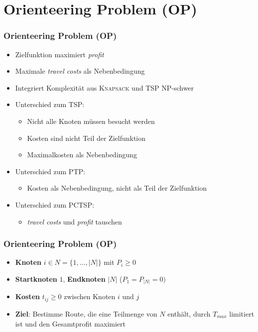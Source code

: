 \documentclass{beamer}
\begin{document}
\section{Orienteering Problem (\textsc{OP})}

\begin{frame}
\frametitle{Orienteering Problem (\textsc{OP})}
\begin{itemize}
  \item Zielfunktion maximiert \textit{profit}
  \item Maximale \textit{travel costs} als Nebenbedingung
  \item Integriert Komplexität aus \textsc{Knapsack} und \textsc{TSP} \textrightarrow NP-schwer
  \item Unterschied zum \textsc{TSP}:
  \begin{itemize}
    \item Nicht alle Knoten müssen besucht werden
    \item Kosten sind nicht Teil der Zielfunktion
    \item Maximalkosten als Nebenbedingung
  \end{itemize}
  \item Unterschied zum \textsc{PTP}: 
  \begin{itemize}
    \item Kosten als Nebenbedingung, nicht als Teil der Zielfunktion
  \end{itemize}
  \item Unterschied zum \textsc{PCTSP}:
  \begin{itemize}
    \item \textit{travel costs} und \textit{profit} tauschen 
  \end{itemize}
\end{itemize}
\end{frame}

\begin{frame}
  \frametitle{Orienteering Problem (\textsc{OP})}
  \begin{itemize}
    \item \textbf{Knoten} $i \in N = \{1, ..., |N|\}$ mit $P_i \geq 0$
    \item \textbf{Startknoten} $1$, \textbf{Endknoten} $|N|$ ($P_1 = P_{|N|} = 0)$
    \item \textbf{Kosten} $t_{ij} \geq 0$ zwischen Knoten $i$ und $j$
    \item \textbf{Ziel}: Bestimme Route, die eine Teilmenge von $N$ enthält, durch $T_{max}$ limitiert ist
    und den Gesamtprofit maximiert
  \end{itemize}
\end{frame}
\end{document}
